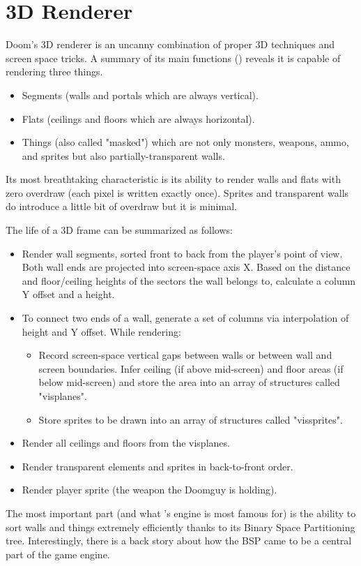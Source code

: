 \section{3D Renderer}
Doom's 3D renderer is an uncanny combination of proper 3D techniques and screen space tricks. A summary of its main functions () reveals it is capable of rendering three things.\\
\par
{}
\par
\begin{itemize}
	\item Segments (walls and portals which are always vertical).
	\item Flats (ceilings and floors which are always horizontal).
	\item Things (also called "masked") which are not only monsters, weapons, ammo, and sprites but also partially-transparent walls.
\end{itemize}
 Its most breathtaking characteristic is its ability to render walls and flats with zero overdraw (each pixel is written exactly once). Sprites and transparent walls do introduce a little bit of overdraw but it is minimal.\\
\par
The life of a 3D frame can be summarized as follows:
\begin{itemize}
\item Render wall segments, sorted front to back from the player's point of view. Both wall ends are projected into screen-space axis X. Based on the distance and floor/ceiling heights of the sectors the wall belongs to, calculate a column Y offset and a height. 
\item To connect two ends of a wall, generate a set of columns via interpolation of height and Y offset. While rendering:
   \begin{itemize}
     \item Record screen-space vertical gaps between walls or between wall and screen boundaries. Infer ceiling (if above mid-screen) and floor areas (if below mid-screen) and store the area into an array of structures called "visplanes".
     \item Store sprites to be drawn into an array of structures called "vissprites".
   \end{itemize}
\item Render all ceilings and floors from the visplanes.
\item Render transparent elements and sprites in back-to-front order.
\item Render player sprite (the weapon the Doomguy is holding).
\end{itemize}
\par
The most important part (and what \doom{}'s engine is most famous for) is the ability to sort walls and things extremely efficiently thanks to its Binary Space Partitioning tree. Interestingly, there is a back story about how the BSP came to be a central part of the game engine.\\
\par
\pagebreak



